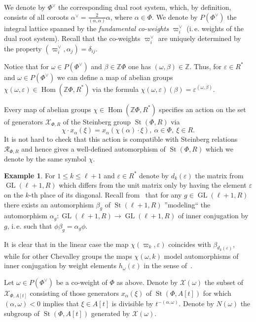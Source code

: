 \documentclass[oneside, 10pt]{amsart}
\DeclareMathOperator{\St}{St}
\DeclareMathOperator{\Hom}{Hom}
\DeclareMathOperator{\GL}{GL}
\newcommand{\ZZ}{\mathbb{Z}}
\newcommand{\XX}{\mathcal{X}}           %
\newcommand{\RR}[1]{\mathcal{R}_{#1}}   %
\numberwithin{equation}{section}
\numberwithin{lemma}{section}
\theoremstyle{definition}
\newtheorem{example}[lemma]{Example}
\theoremstyle{remark}
\begin{document}
We denote by $\Phi^\vee$ the corresponding dual root system, which, by definition, consists of all coroots 
 $\alpha^\vee = \frac{2}{(\alpha, \alpha)} \alpha$, where $\alpha \in \Phi$.
We denote by $P(\Phi^\vee)$ the integral lattice spanned by the \emph{fundamental co-weights $\varpi^\vee_i$} (i.\,e. weights of the dual root system).
Recall that the co-weights $\varpi^\vee_i$ are uniquely determined by the property $(\varpi_i^\vee, \alpha_j) = \delta_{ij}$.

Notice that for $\omega \in P(\Phi^\vee)$ and $\beta \in \ZZ \Phi$ one has $(\omega, \beta) \in \ZZ $.
Thus, for $\varepsilon \in R^*$ and $\omega \in P(\Phi^\vee)$ we can define a map of abelian groups $\chi(\omega, \varepsilon) \in \Hom(\ZZ \Phi, R^*)$
 via the formula $\chi(\omega, \varepsilon)(\beta) = \varepsilon ^ {(\omega, \beta)}$.

Every map of abelian groups $\chi \in \Hom(\ZZ \Phi, R^*)$ specifies an action on the set of generators $\XX_{\Phi, R}$ of the Steinberg group $\St(\Phi, R)$ via
\begin{equation*} \chi \cdot x_\alpha(\xi) = x_\alpha(\chi(\alpha) \cdot \xi),\ \alpha\in \Phi,\ \xi \in R. \end{equation*}
It is not hard to check that this action is compatible with Steinberg relations $\RR{\Phi, R}$ and 
 hence gives a well-defined automorphism of $\St(\Phi, R)$ which we denote by the same symbol $\chi$.
 
\begin{example} \label{exm:chi-linear}
For $1\leq k\leq \ell+1$ and $\varepsilon \in R^*$ denote by $d_k(\varepsilon)$ the matrix from $\GL(\ell+1, R)$ which differs from the unit matrix 
 only by having the element $\varepsilon$ on the $k$-th place of its diagonal.
Recall from~\cite[Corollary~4]{Ka77} that for any $g \in \GL(\ell+1, R)$ there exists an automorphism $\beta_g$ of $\St(\ell+1, R)$ 
 ''modeling`` the automorphism $\alpha_g \colon \GL(\ell+1, R) \to \GL(\ell+1, R)$ of inner conjugation by $g$, i.\,e. such that $\phi \beta_g = \alpha_g \phi$.

It is clear that in the linear case the map $\chi(\varpi_k, \varepsilon)$ coincides with $\beta_{d_k(\varepsilon)}$, 
 while for other Chevalley groups the maps $\chi(\omega, k)$ model automorphisms of inner conjugation by weight elements $h_\omega(\varepsilon)$
  in the sense of~\cite[\S~4]{Vav09}.
\end{example}

Let $\omega \in P(\Phi^\vee)$ be a co-weight of $\Phi$ as above.
Denote by $\XX(\omega)$ the subset of $\XX_{\Phi, A[t]}$ consisting of those generators $x_{\alpha}(\xi)$ of $\St(\Phi, A[t])$ for which 
$(\alpha, \omega) < 0$ implies that $\xi \in A[t]$ is divisible by $t^{-(\alpha, \omega)}$. Denote by $N(\omega)$ the subgroup of $\St(\Phi, A[t])$ generated by $\XX(\omega)$.
\end{document}
